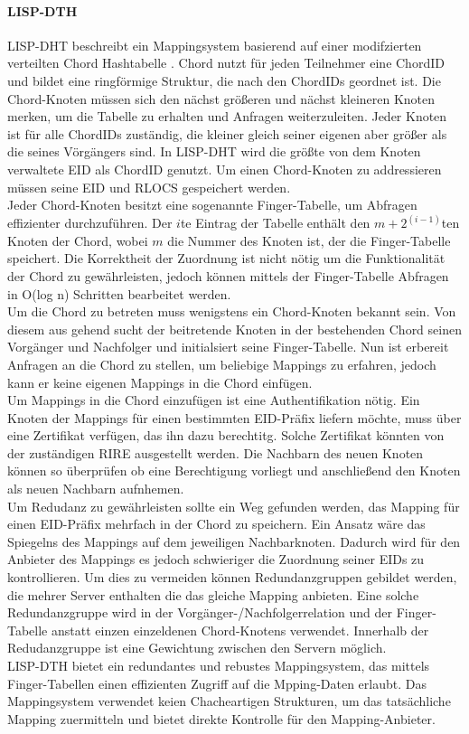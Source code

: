 \paragraph{LISP-DTH} 
LISP-DHT beschreibt ein Mappingsystem basierend auf einer modifzierten verteilten Chord Hashtabelle \cite{mathy:2008:dht}. Chord nutzt für jeden Teilnehmer eine ChordID und bildet eine ringförmige Struktur, die nach den ChordIDs geordnet ist. Die Chord-Knoten müssen sich den nächst größeren und nächst kleineren Knoten merken, um die Tabelle zu erhalten und Anfragen weiterzuleiten. Jeder Knoten ist für alle ChordIDs zuständig, die kleiner gleich seiner eigenen aber größer als die seines Vörgängers sind. In LISP-DHT wird die größte von dem Knoten verwaltete EID als ChordID genutzt. Um einen Chord-Knoten zu addressieren müssen seine EID und RLOCS gespeichert werden. \\
Jeder Chord-Knoten besitzt eine sogenannte Finger-Tabelle, um Abfragen effizienter durchzuführen. Der $i$te Eintrag der Tabelle enthält den $m+2^(i-1)$ten Knoten der Chord, wobei $m$ die Nummer des Knoten ist, der die Finger-Tabelle speichert. Die Korrektheit der Zuordnung ist nicht nötig um die Funktionalität der Chord zu gewährleisten, jedoch können mittels der Finger-Tabelle Abfragen in O(log n) Schritten bearbeitet werden. \\
Um  die Chord zu betreten muss wenigstens ein Chord-Knoten bekannt sein. Von diesem aus gehend sucht der beitretende Knoten in der bestehenden Chord seinen Vorgänger und  Nachfolger und initialsiert seine Finger-Tabelle. Nun ist erbereit Anfragen an die Chord zu stellen, um beliebige Mappings zu erfahren, jedoch kann er keine eigenen Mappings in die Chord einfügen. \\
Um Mappings in die Chord einzufügen ist eine Authentifikation nötig. Ein Knoten der Mappings für einen bestimmten EID-Präfix liefern möchte, muss über eine Zertifikat verfügen, das ihn dazu berechtitg. Solche Zertifikat könnten von der zuständigen RIRE ausgestellt werden. Die Nachbarn des neuen Knoten können so überprüfen ob eine Berechtigung vorliegt und anschließend den Knoten als neuen Nachbarn aufnhemen. \\
Um Redudanz zu gewährleisten sollte ein Weg gefunden werden, das Mapping für einen EID-Präfix mehrfach in der Chord zu speichern. Ein Ansatz wäre das Spiegelns des Mappings auf dem jeweiligen Nachbarknoten. Dadurch wird für den Anbieter des Mappings es jedoch schwieriger die Zuordnung seiner EIDs zu kontrollieren. Um dies zu vermeiden können Redundanzgruppen gebildet werden, die mehrer Server enthalten die das gleiche Mapping anbieten. Eine solche Redundanzgruppe wird in der Vorgänger-/Nachfolgerrelation und der Finger-Tabelle anstatt einzen einzeldenen Chord-Knotens verwendet. Innerhalb der Redudanzgruppe ist eine Gewichtung zwischen den Servern möglich. \\
LISP-DTH bietet ein redundantes und rebustes Mappingsystem, das mittels Finger-Tabellen einen effizienten Zugriff auf die Mpping-Daten erlaubt. Das Mappingsystem verwendet keien Chacheartigen Strukturen, um das tatsächliche Mapping zuermitteln und bietet direkte Kontrolle für den Mapping-Anbieter. 



